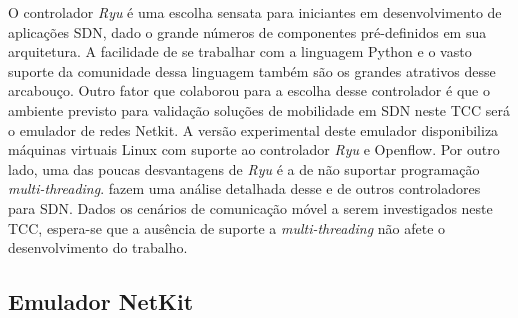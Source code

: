 \documentclass[	12pt, Times, openright, twoside, a4paper, english, brazil]{abntex2}
\begin{document}


O controlador \textit{Ryu} é uma escolha sensata para iniciantes em  desenvolvimento de aplicações SDN, dado o grande números de componentes pré-definidos em sua arquitetura. A facilidade de se trabalhar com a linguagem Python e o vasto suporte da comunidade dessa linguagem também são os grandes atrativos desse arcabouço. Outro fator que colaborou para a escolha desse controlador é que o ambiente previsto para validação soluções de mobilidade em SDN neste TCC será o emulador de redes Netkit. A versão experimental deste emulador disponibiliza máquinas virtuais Linux com suporte ao controlador \textit{Ryu} e Openflow. Por outro lado, uma das poucas desvantagens de \textit{Ryu} é a de não suportar programação \textit{multi-threading}.  fazem uma análise detalhada desse e de outros controladores para SDN. Dados os cenários de comunicação móvel a serem investigados neste TCC, espera-se que a ausência de suporte a \textit{multi-threading} não afete o desenvolvimento do  trabalho.


\subsection{Emulador NetKit}


\end{document}
